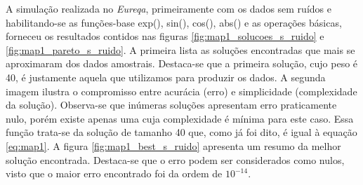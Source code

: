 	\FloatBarrier
	
A simulação realizada no \textit{Eureqa}, primeiramente com os dados sem ruídos
e habilitando-se as funções-base exp(), sin(), cos(), abs() e as operações
básicas, forneceu os resultados contidos nas figuras
\ref{fig:map1_solucoes_s_ruido} e \ref{fig:map1_pareto_s_ruido}. A primeira
lista as soluções encontradas que mais se aproximaram dos dados amostrais.
Destaca-se que a primeira solução, cujo peso é 40, é justamente aquela que
utilizamos para produzir os dados. A segunda imagem ilustra o compromisso entre
acurácia (erro) e simplicidade (complexidade da solução). Observa-se que
inúmeras soluções apresentam erro praticamente nulo, porém existe apenas uma
cuja complexidade é mínima para este caso. Essa função trata-se da solução de
tamanho 40 que, como já foi dito, é igual à equação \ref{eq:map1}. A figura
\ref{fig:map1_best_s_ruido} apresenta um resumo da melhor solução encontrada.
Destaca-se que o erro podem ser considerados como nulos, visto que o maior erro
encontrado foi da ordem de \(10^{-14}\).

\FloatBarrier
			    
